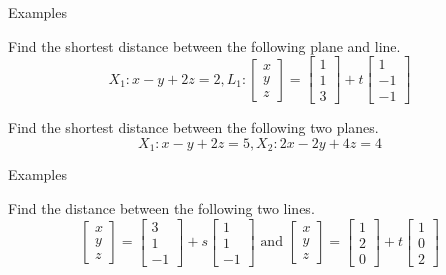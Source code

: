 \documentclass{beamer}
\begin{document}
\begin{frame}{Examples}
\begin{example}
Find the shortest distance between the following plane and line.
\begin{equation*}
X_1:x-y+2z=2, L_1:\left[
\begin{array}{c}
x\\
y\\
z
\end{array}
\right] = \left[
\begin{array}{c}
1\\
1\\
3
\end{array}
\right]+t \left[
\begin{array}{c}
1\\
-1\\
-1
\end{array}
\right]
\end{equation*}
\end{example}
\begin{example}
Find the shortest distance between the following two planes.
\begin{equation*}
X_1:x-y+2z=5, X_2:2x-2y+4z=4
\end{equation*}
\end{example}
\end{frame}

\begin{frame}{Examples}
\begin{example}
Find the distance between the following two lines.
\begin{equation*}
\left[
\begin{array}{c}
x\\
y\\
z
\end{array}
\right] = \left[
\begin{array}{c}
3\\
1\\
-1
\end{array}
\right]+s \left[
\begin{array}{c}
1\\
1\\
-1
\end{array}
\right]\text{ and } \left[
\begin{array}{c}
x\\
y\\
z
\end{array}
\right] = \left[
\begin{array}{c}
1\\
2\\
0
\end{array}
\right] +t \left[
\begin{array}{c}
1\\
0\\
2
\end{array}
\right]
\end{equation*}
\end{example}
\end{frame}
\end{document}
